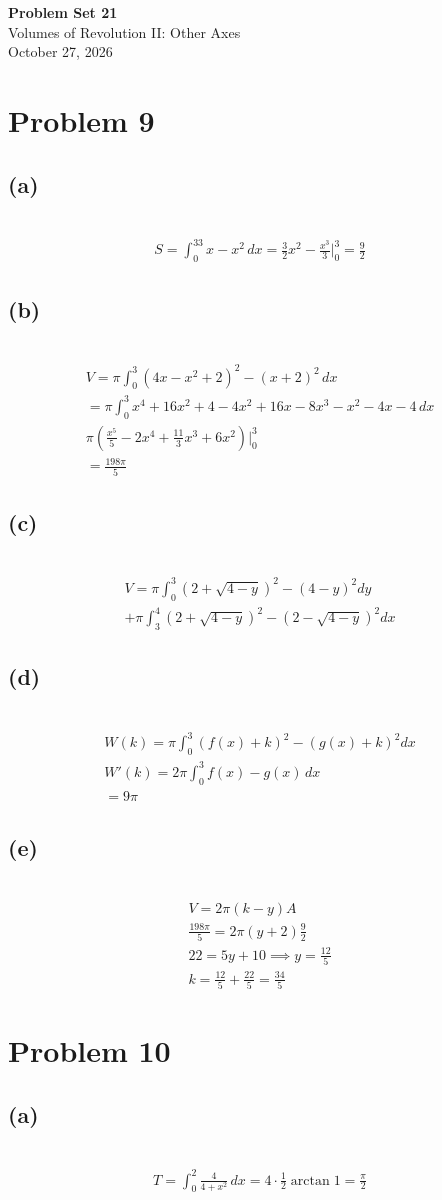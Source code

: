 \documentclass[12pt]{article}
\newcommand{\problem}[1]{\section{Problem #1}}
\newcommand{\subproblem}[1]{\subsection{(#1)} \,}
\begin{document}
\vspace*{0cm}

\begin{center}
    {\Large \bfseries Problem Set 21} \\[0.5cm]
    {\large Volumes of Revolution II: Other Axes} \\[0.35cm]
    {\normalsize October 27, 2026}
\end{center}


\problem{9}

\subproblem{a}
\begin{gather*}
    S=\int_0^33x-x^2\, dx = \frac{3}{2}x^2-\frac{x^3}{3}\Big|^3_0=\boxed{\frac{9}{2}}
\end{gather*}

\subproblem{b}
\begin{gather*}
    V=\pi \int_0^3 (4x-x^2+2)^2-(x+2)^2\, dx\\
    =\pi \int_0^3 x^4+16x^2+4-4x^2+16x-8x^3-x^2-4x-4\, dx\\
    \pi (\frac{x^5}{5}-2x^4+\frac{11}{3}x^3+6x^2)\Big|_0^3\\
    = \boxed{\frac{198\pi}{5}}
\end{gather*}

\subproblem{c}
\begin{gather*}
    V = \pi \int_{0}^{3} \left(2 + \sqrt{4-y}\right)^2 - (4-y)^2  dy \\+ \pi \int_{3}^{4}  \left(2 + \sqrt{4-y}\right)^2 - \left(2 - \sqrt{4-y}\right)^2 dx
\end{gather*}

\subproblem{d}
\begin{gather*}
    W(k) = \pi \int_{0}^{3} (f(x) + k)^2 - (g(x) + k)^2 dx\\
    W'(k)=2\pi \int_0^3 f(x)-g(x)\, dx\\
    =\boxed{9\pi}
\end{gather*}

\subproblem{e}
\begin{gather*}
    V=2\pi (k-y)A\\
    \frac{198\pi}{5}=2\pi (y+2)\frac{9}{2}\\
    22=5y+10 \implies y= \frac{12}{5}\\
    k=\frac{12}{5}+\frac{22}{5}=\boxed{\frac{34}{5}}
\end{gather*}

\problem{10}

\subproblem{a}
\begin{gather*}
    T=\int_0^2\frac{4}{4+x^2} \, dx = 4\cdot \frac{1}{2} \arctan 1 = \boxed{\frac{\pi}{2}}
\end{gather*}
\end{document}

